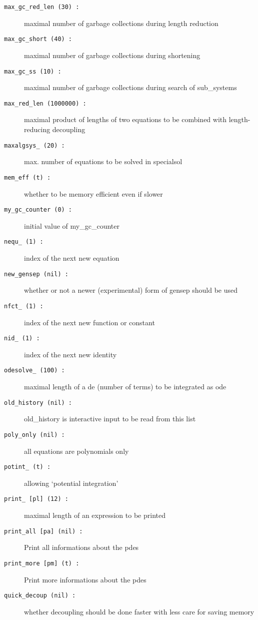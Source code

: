 \documentclass[12pt]{article}
\begin{document}
\begin{description}
\item[{\tt max\_gc\_red\_len (30) :}] maximal number of garbage collections during
                    length reduction
\item[{\tt max\_gc\_short (40) :}] maximal number of garbage collections during shortening
\item[{\tt max\_gc\_ss (10) :}] maximal number of garbage collections during
                    search of sub\_systems
\item[{\tt max\_red\_len (1000000) :}] maximal product of lengths of two 
                    equations to be combined with length-reducing decoupling
\item[{\tt maxalgsys\_ (20) :}] max. number of equations to be solved
                    in specialsol 
\item[{\tt mem\_eff (t) :}] whether to be memory efficient even if slower
\item[{\tt my\_gc\_counter (0) :}] initial value of my\_gc\_counter
\item[{\tt nequ\_ (1) :}] index of the next new equation
\item[{\tt new\_gensep (nil) :}] whether or not a newer (experimental)
                    form of gensep should be used
\item[{\tt nfct\_ (1) :}] index of the next new function or constant
\item[{\tt nid\_ (1) :}] index of the next new identity
\item[{\tt odesolve\_ (100) :}] maximal length of a de (number of terms) to be
                    integrated as ode
\item[{\tt old\_history (nil) :}] 
                   old\_history is interactive input to be read from
                   this list
\item[{\tt poly\_only (nil) :}] all equations are polynomials only 
\item[{\tt potint\_ (t) :}] allowing `potential integration'
\item[{\tt print\_ [pl] (12) :}] maximal length of an expression to be printed
\item[{\tt print\_all [pa] (nil) :}] Print all informations about the pdes
\item[{\tt print\_more [pm] (t) :}] Print more informations about the pdes
\item[{\tt quick\_decoup (nil) :}] whether decoupling should be done
                    faster with less care for saving memory

\end{description}
\end{document}

